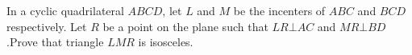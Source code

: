 In a cyclic quadrilateral $ABCD$, let $L$ and $M$ be the incenters of $ABC$ and $BCD$ respectively. Let $R$ be a point on the plane such that $LR\bot AC$ and $MR\bot BD$.Prove that triangle $LMR$ is isosceles.
